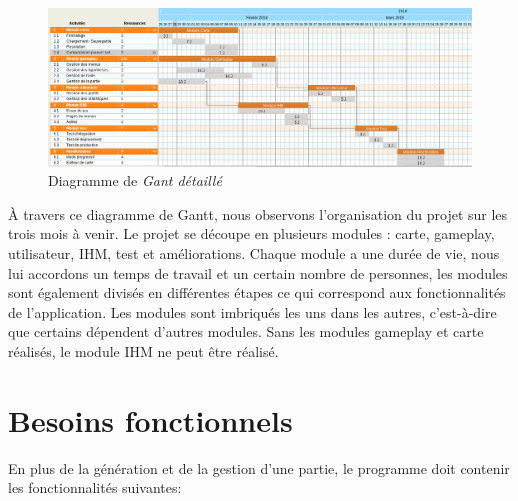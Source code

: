 \documentclass{report}
\begin{document}
    \begin{figure}[H]
	\caption{Diagramme de \textit{Gant détaillé}}
	\includegraphics[width=17cm]{ganttDetaille.png}
    \end{figure}
   
     À travers ce diagramme de Gantt, nous observons l'organisation du projet sur les trois mois à venir. Le projet se découpe en plusieurs modules : carte, gameplay, utilisateur, IHM, test et améliorations.
    Chaque module a une durée de vie, nous lui accordons un temps de travail et un certain nombre de personnes, les modules sont également divisés en différentes étapes ce qui correspond aux fonctionnalités de l'application. Les modules sont imbriqués les uns dans les autres, c'est-à-dire que certains dépendent d'autres modules. Sans les modules gameplay et carte réalisés, le module IHM ne peut être réalisé. 

   \section{Besoins fonctionnels}
   
    En plus de la génération et de la gestion d'une partie, le programme doit contenir les fonctionnalités suivantes:
\end{document}
